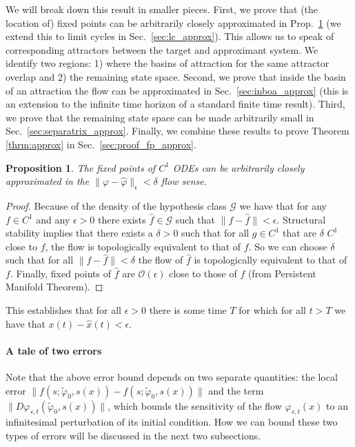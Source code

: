 \documentclass{article}
\newtheorem{proposition}{Proposition}
\theoremstyle{definition}
\theoremstyle{remark}
\newcounter{ct}
\begin{document}
We will break down this result in smaller pieces. 
First, we prove that (the location of) fixed points can be arbitrarily closely approximated in Prop.~\ref{prop:fp_approx} (we extend this to limit cycles in Sec.~\ref{sec:lc_approx}).
This allows us to speak of corresponding attractors between the target and approximant system.
We identify two regions: 1) where the basins of attraction for the same attractor overlap and 2) the remaining state space.
Second, we prove that inside the basin of an attraction the flow can be approximated in Sec.~\ref{sec:inboa_approx} (this is an extension to the infinite time horizon of a standard finite time result). %
Third, we prove that the remaining state space can be made arbitrarily small in Sec.~\ref{sec:separatrix_approx}.
Finally, we combine these results to prove Theorem \ref{thrm:approx} in Sec.~\ref{sec:proof_fp_approx}.

\begin{proposition}\label{prop:fp_approx}
The fixed points of $C^1$ ODEs can be arbitrarily closely approximated in the $\|\varphi-\hat \varphi\|_\epsilon < \delta$ flow sense.
\end{proposition}

\begin{proof}
Because of the density of the hypothesis class $\mathcal{G}$ we have that for any $f\in C^1$ and any $\epsilon>0$
there exists $\hat f\in\mathcal{G}$ such that $\|f-\hat f\|<\epsilon$.
%
Structural stability implies that there exists a $\delta>0$ such that for all $g\in C^1$ that are $\delta$ $C^1$ close to $f$, the flow is topologically equivalent to that of $f$.
%
So we can choose $\delta$ such that for all $\|f-\hat f\|<\delta$ the flow of $\hat f$ is topologically equivalent to that of $f$.
Finally, fixed points of $\hat f$ are $\mathcal{O}(\epsilon)$ close to those of $f$ (from Persistent Manifold Theorem\cite{jones1995gspt}).
\end{proof}

This establishes that for all $\epsilon>0$ there is some time $T$ for which for all $t>T$ we have that $x(t)-\hat x(t)<\epsilon$.


\paragraph{A tale of two errors}
Note that the above error bound depends on two separate quantities: the local error 
$\| f(s; \tilde{\varphi}_0, s(x)) - f(s; \tilde{\varphi}_0, s(x)) \|$ 
 and the term 
$\| D\varphi_{s,t}(\tilde{\varphi}_0, s(x)) \|$, 
which bounds the sensitivity of the flow $\varphi_{s,t}(x)$ to an infinitesimal perturbation of its initial condition.
How we can bound these two types of errors will be discussed in the next two subsections.%
\end{document}
